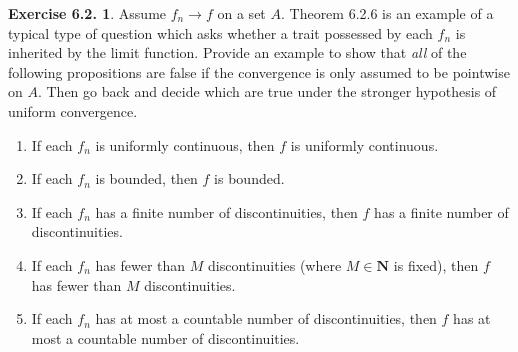 \documentclass[12pt]{article}
\theoremstyle{definition}
\theoremstyle{exercise}
\newtheorem{exercise}{Exercise 6.2.}
\theoremstyle{solution}
\newcommand{\N}{\mathbf{N}}
\begin{document}
\begin{exercise}
\label{ex:6}
    Assume \( f_n \to f \) on a set \( A \). Theorem 6.2.6 is an example of a typical type of question which asks whether a trait possessed by each \( f_n \) is inherited by the limit function. Provide an example to show that \textit{all} of the following propositions are false if the convergence is only assumed to be pointwise on \( A \). Then go back and decide which are true under the stronger hypothesis of uniform convergence.
    \begin{enumerate}
        \item If each \( f_n \) is uniformly continuous, then \( f \) is uniformly continuous.

        \item If each \( f_n \) is bounded, then \( f \) is bounded.

        \item If each \( f_n \) has a finite number of discontinuities, then \( f \) has a finite number of discontinuities.

        \item If each \( f_n \) has fewer than \( M \) discontinuities (where \( M \in \N \) is fixed), then \( f \) has fewer than \( M \) discontinuities.

        \item If each \( f_n \) has at most a countable number of discontinuities, then \( f \) has at most a countable number of discontinuities.
    \end{enumerate}
\end{exercise}
\end{document}

